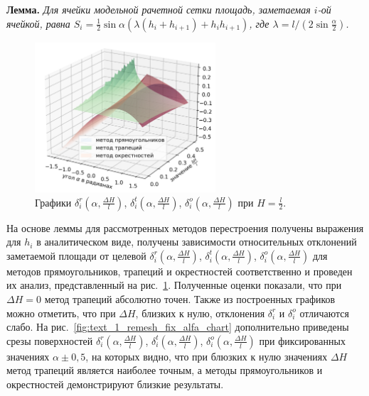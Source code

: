 \documentclass[a4paper,14pt]{extarticle}                     %
\theoremstyle{plain}                                         %
\begin{document}
\textbf{Лемма.} \textit{Для ячейки модельной рачетной сетки площадь, заметаемая $i$-ой ячейкой, равна $S_i = \frac{1}{2} \sin \alpha \left( \lambda(h_i + h_{i+1}) + h_ih_{i+1} \right)$, где $\lambda = l / (2 \sin \frac{\alpha}{2})$.}

\begin{figure}[ht]
\centering
\includegraphics[width=0.6\textwidth]{fig/2dr_remesh_3d_chart_big.png}
\singlespacing
\caption{Графики $\delta_i^r(\alpha, \frac{\Delta H}{l})$, $\delta_i^t(\alpha, \frac{\Delta H}{l})$, $\delta_i^o(\alpha, \frac{\Delta H}{l})$ при $H = \frac{l}{2}$.}
\label{fig:text_1_remesh_3d_main_chart}
\end{figure}

На основе леммы для рассмотренных методов перестроения получены выражения для $h_i$ в аналитическом виде, получены зависимости относительных отклонений заметаемой площади от целевой $\delta_i^r(\alpha, \frac{\Delta H}{l})$, $\delta_i^t(\alpha, \frac{\Delta H}{l})$, $\delta_i^o(\alpha, \frac{\Delta H}{l})$ для методов прямоугольников, трапеций и окрестностей соответственно и проведен их анализ, представленный на рис.~\ref{fig:text_1_remesh_3d_main_chart}.
Полученные оценки показали, что при $\Delta H = 0$ метод трапеций абсолютно точен.
Также из построенных графиков можно отметить, что при $\Delta H$, близких к нулю, отклонения $\delta_i^r$ и $\delta_i^o$ отличаются слабо.
На рис.~\ref{fig:text_1_remesh_fix_alfa_chart} дополнительно приведены срезы поверхностей $\delta_i^r(\alpha, \frac{\Delta H}{l})$, $\delta_i^t(\alpha, \frac{\Delta H}{l})$, $\delta_i^o(\alpha, \frac{\Delta H}{l})$ при фиксированных значениях $\alpha \pm 0,5$, на которых видно, что при блюзких к нулю значениях $\Delta H$ метод трапеций является наиболее точным, а методы прямоугольников и окрестностей демонстрируют близкие результаты.
\end{document}

